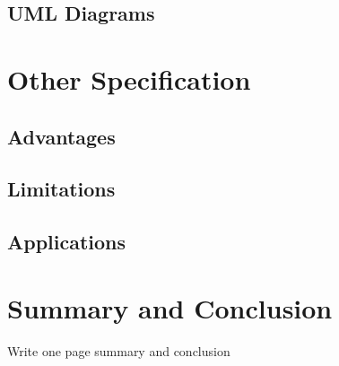 \documentclass[oneside,a4paper,12pt]{report}
\begin{document}
\section{UML Diagrams} 

\chapter{Other Specification}
\section{Advantages}
\section{Limitations}
\section{Applications}

\chapter{Summary and Conclusion}
Write one page summary and conclusion 



\end{document}
